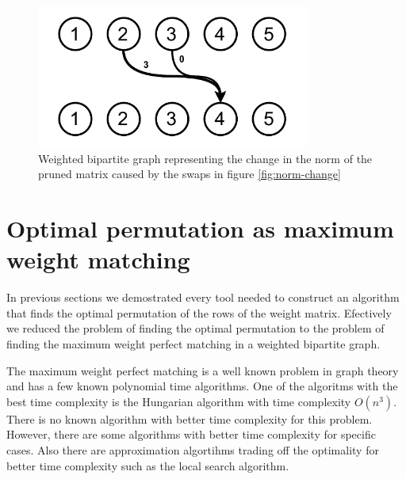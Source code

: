 \begin{figure}[h]
    \centerline{\includegraphics[width=0.8\textwidth]{images/weighted}}
    \caption[Weighted bipartite graph]{Weighted bipartite graph representing the change in the norm of the pruned matrix caused by the swaps in figure \ref{fig:norm-change}}
    \label{fig:weighted}
\end{figure}

\section{Optimal permutation as maximum weight matching}

In previous sections we demostrated every tool needed to construct an algorithm that finds the optimal permutation of the rows of the weight matrix. Efectively we reduced the problem of finding the optimal permutation to the problem of finding the maximum weight perfect matching in a weighted bipartite graph.

The maximum weight perfect matching is a well known problem in graph theory and has a few known polynomial time algorithms. One of the algoritms with the best time complexity is the Hungarian algorithm with time complexity $O(n^3)$. There is no known algorithm with better time complexity for this problem. However, there are some algorithms with better time complexity for specific cases. Also there are approximation algortihms trading off the optimality for better time complexity such as the local search algorithm. 
